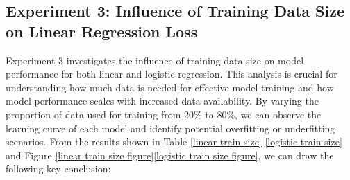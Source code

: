 \documentclass{article}
\begin{document}
\begin{table}[H]
\begin{minipage}{0.45\textwidth}
    \end{minipage}
    \hfill
    \begin{minipage}{0.45\textwidth} %
        \centering
        \vspace{7pt}
        \caption{Top 10 Features by Absolute Weights in SGD Linear Regression}
        \label{SGD linear features}
    \end{minipage}
\end{table}


\subsection{Experiment 3: Influence of Training Data Size on Linear Regression Loss}
Experiment 3 investigates the influence of training data size on model performance for both linear and logistic regression. This analysis is crucial for understanding how much data is needed for effective model training and how model performance scales with increased data availability. By varying the proportion of data used for training from 20\% to 80\%, we can observe the learning curve of each model and identify potential overfitting or underfitting scenarios.
\noindent From the results shown in Table \ref{linear train size} \ref{logistic train size} and Figure \ref{linear train size figure}\ref{logistic train size figure}, we can draw the following key conclusion:
\end{document}
